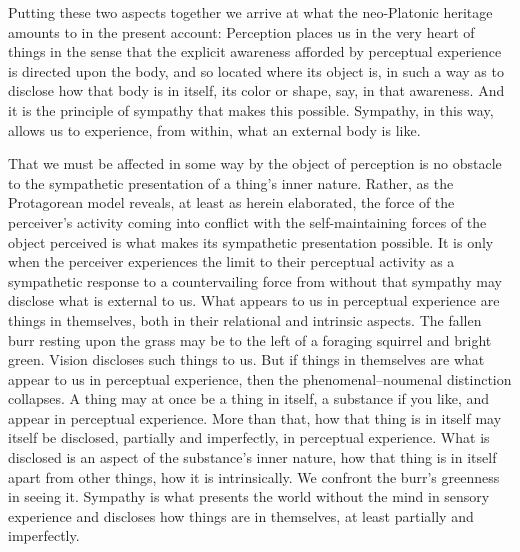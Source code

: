 Putting these two aspects together we arrive at what the neo-Platonic heritage amounts to in the present account: Perception places us in the very heart of things in the sense that the explicit awareness afforded by perceptual experience is directed upon the body, and so located where its object is, in such a way as to disclose how that body is in itself, its color or shape, say, in that awareness. And it is the principle of sympathy that makes this possible. Sympathy, in this way, allows us to experience, from within, what an external body is like.

That we must be affected in some way by the object of perception is no obstacle to the sympathetic presentation of a thing's inner nature. Rather, as the Protagorean model reveals, at least as herein elaborated, the force of the perceiver's activity coming into conflict with the self-maintaining forces of the object perceived is what makes its sympathetic presentation possible. It is only when the perceiver experiences the limit to their perceptual activity as a sympathetic response to a countervailing force from without that sympathy may disclose what is external to us. What appears to us in perceptual experience are things in themselves, both in their relational and intrinsic aspects. The fallen burr resting upon the grass may be to the left of a foraging squirrel and bright green. Vision discloses such things to us. But if things in themselves are what appear to us in perceptual experience, then the phenomenal--noumenal distinction collapses. A thing may at once be a thing in itself, a substance if you like, and appear in perceptual experience. More than that, how that thing is in itself may itself be disclosed, partially and imperfectly, in perceptual experience. What is disclosed is an aspect of the substance's inner nature, how that thing is in itself apart from other things, how it is intrinsically. We confront the burr's greenness in seeing it. Sympathy is what presents the world without the mind in sensory experience and discloses how things are in themselves, at least partially and imperfectly.


